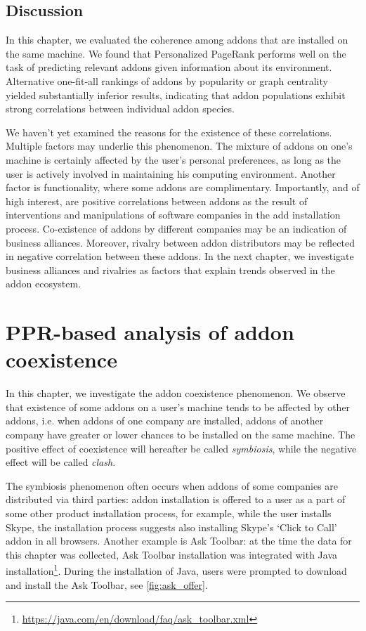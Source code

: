 \documentclass[11pt,oneside]{book}
\let\Oldsection\section
\renewcommand{\section}{\FloatBarrier\Oldsection}
\begin{document}
\section{Discussion}

In this chapter, we evaluated the coherence among addons that are installed on the same machine. We found that Personalized PageRank performs well on the task of predicting relevant addons given information about its environment. Alternative one-fit-all rankings of addons by popularity or graph centrality yielded substantially inferior results, indicating that addon populations exhibit strong correlations between individual addon species.  

We haven't yet examined the reasons for the existence of these correlations. Multiple factors may underlie this phenomenon. The mixture of addons on one's machine is certainly affected by the user's personal preferences, as long as the user is actively involved in maintaining his computing environment. Another factor is functionality, where some addons are complimentary. Importantly, and of high interest, are positive correlations between addons as the result of interventions and manipulations of software companies in the add installation process. Co-existence of addons by different companies may be an indication of  business alliances. Moreover, rivalry between addon distributors may be reflected in negative correlation between these addons. In the next chapter, we investigate business alliances and rivalries as factors that explain trends observed in the addon ecosystem.  

\chapter{PPR-based analysis of addon coexistence}
\label{chap:Symbiosis}

In this chapter, we investigate the addon coexistence phenomenon. We observe that existence of some addons on a user's machine tends to be affected by other addons, i.e. when addons of one company are installed, addons of another company have greater or lower chances to be installed on the same machine. The positive effect of coexistence will hereafter be called \emph{symbiosis}, while the negative effect will be called \emph{clash}.

The symbiosis phenomenon often occurs when addons of some companies are distributed via third parties: addon installation is offered to a user as a part of some other product installation process, for example, while the user installs Skype, the installation process suggests also installing Skype's `Click to Call' addon in all browsers. Another example is Ask Toolbar: at the time the data for this chapter was collected, Ask Toolbar installation was integrated with Java installation\footnote{\url{https://java.com/en/download/faq/ask_toolbar.xml}}. During the installation of Java, users were prompted to download and install the Ask Toolbar, see \autoref{fig:ask_offer}. 
\end{document}
